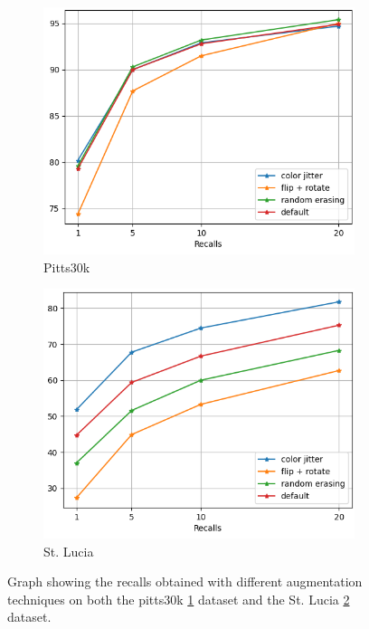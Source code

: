 \documentclass[10pt,twocolumn,letterpaper]{article}
\begin{document}
\begin{figure}
   \centering
   \begin{subfigure}[b]{0.23\textwidth}
      \centering
      \includegraphics[width=\textwidth]{img/augment/test_pitts30k_recalls_graph.png}
      \caption{Pitts30k}
      \label{fig:recalls:augment:pitts30k}
   \end{subfigure}
   \hfill
   \begin{subfigure}[b]{0.23\textwidth}
      \centering
      \includegraphics[width=\textwidth]{img/augment/test_st_lucia_recalls_graph.png}
      \caption{St. Lucia}
      \label{fig:recalls:augment:st_lucia}
   \end{subfigure}
   \caption{Graph showing the recalls obtained with different augmentation techniques on both the pitts30k \ref{fig:recalls:augment:pitts30k} dataset and the St. Lucia \ref{fig:recalls:augment:st_lucia} dataset.}
   \label{fig:recalls:augment}
\end{figure}
\end{document}
